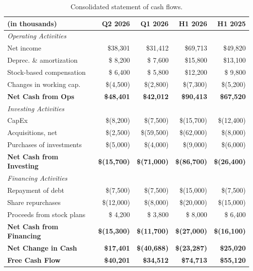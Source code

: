 \documentclass[
    language=english,
    doctype=financial-report,
    institution=none,
]{../../omnilatex}
\begin{document}
\begin{table}[h]
    \centering
    \begin{tabular}{lrrrr}
        \toprule
        \textbf{(in thousands)} & \textbf{Q2 2026} & \textbf{Q1 2026} & \textbf{H1 2026} & \textbf{H1 2025} \\
        \midrule
        \multicolumn{5}{l}{\textit{Operating Activities}} \\
        \quad Net income              & \$38,301 & \$31,412 & \$69,713 & \$49,820 \\
        \quad Deprec. \& amortization & \$ 8,200 & \$ 7,600 & \$15,800 & \$13,100 \\
        \quad Stock-based compensation & \$ 6,400 & \$ 5,800 & \$12,200 & \$ 9,800 \\
        \quad Changes in working cap.  & \$(4,500) & \$(2,800) & \$(7,300) & \$(5,200) \\
        \midrule
        \textbf{Net Cash from Ops}   & \textbf{\$48,401} & \textbf{\$42,012} & \textbf{\$90,413} & \textbf{\$67,520} \\
        \midrule
        \multicolumn{5}{l}{\textit{Investing Activities}} \\
        \quad CapEx                   & \$(8,200) & \$(7,500) & \$(15,700) & \$(12,400) \\
        \quad Acquisitions, net       & \$(2,500) & \$(59,500) & \$(62,000) & \$(8,000) \\
        \quad Purchases of investments & \$(5,000) & \$(4,000) & \$(9,000) & \$(6,000) \\
        \midrule
        \textbf{Net Cash from Investing} & \textbf{\$(15,700)} & \textbf{\$(71,000)} & \textbf{\$(86,700)} & \textbf{\$(26,400)} \\
        \midrule
        \multicolumn{5}{l}{\textit{Financing Activities}} \\
        \quad Repayment of debt       & \$(7,500) & \$(7,500) & \$(15,000) & \$(7,500) \\
        \quad Share repurchases       & \$(12,000) & \$(8,000) & \$(20,000) & \$(15,000) \\
        \quad Proceeds from stock plans & \$ 4,200 & \$ 3,800 & \$ 8,000 & \$ 6,400 \\
        \midrule
        \textbf{Net Cash from Financing} & \textbf{\$(15,300)} & \textbf{\$(11,700)} & \textbf{\$(27,000)} & \textbf{\$(16,100)} \\
        \midrule
        \textbf{Net Change in Cash}  & \textbf{\$17,401} & \textbf{\$(40,688)} & \textbf{\$(23,287)} & \textbf{\$25,020} \\
        \textbf{Free Cash Flow}       & \textbf{\$40,201} & \textbf{\$34,512} & \textbf{\$74,713} & \textbf{\$55,120} \\
        \bottomrule
    \end{tabular}
    \caption{Consolidated statement of cash flows.}
\end{table}
\end{document}
